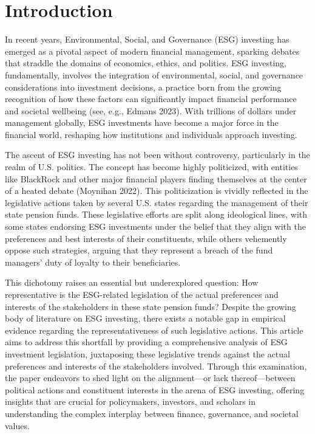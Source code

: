 \documentclass[
  12pt,
]{article}
\begin{document}
\hypertarget{introduction}{%
\section{Introduction}\label{introduction}}

In recent years, Environmental, Social, and Governance (ESG) investing has emerged as a pivotal aspect of modern financial management, sparking debates that straddle the domains of economics, ethics, and politics. ESG investing, fundamentally, involves the integration of environmental, social, and governance considerations into investment decisions, a practice born from the growing recognition of how these factors can significantly impact financial performance and societal wellbeing (see, e.g., Edmans 2023). With trillions of dollars under management globally, ESG investments have become a major force in the financial world, reshaping how institutions and individuals approach investing.

The ascent of ESG investing has not been without controversy, particularly in the realm of U.S. politics. The concept has become highly politicized, with entities like BlackRock and other major financial players finding themselves at the center of a heated debate (Moynihan 2022). This politicization is vividly reflected in the legislative actions taken by several U.S. states regarding the management of their state pension funds. These legislative efforts are split along ideological lines, with some states endorsing ESG investments under the belief that they align with the preferences and best interests of their constituents, while others vehemently oppose such strategies, arguing that they represent a breach of the fund managers' duty of loyalty to their beneficiaries.

This dichotomy raises an essential but underexplored question: How representative is the ESG-related legislation of the actual preferences and interests of the stakeholders in these state pension funds? Despite the growing body of literature on ESG investing, there exists a notable gap in empirical evidence regarding the representativeness of such legislative actions. This article aims to address this shortfall by providing a comprehensive analysis of ESG investment legislation, juxtaposing these legislative trends against the actual preferences and interests of the stakeholders involved. Through this examination, the paper endeavors to shed light on the alignment---or lack thereof---between political actions and constituent interests in the arena of ESG investing, offering insights that are crucial for policymakers, investors, and scholars in understanding the complex interplay between finance, governance, and societal values.
\end{document}
